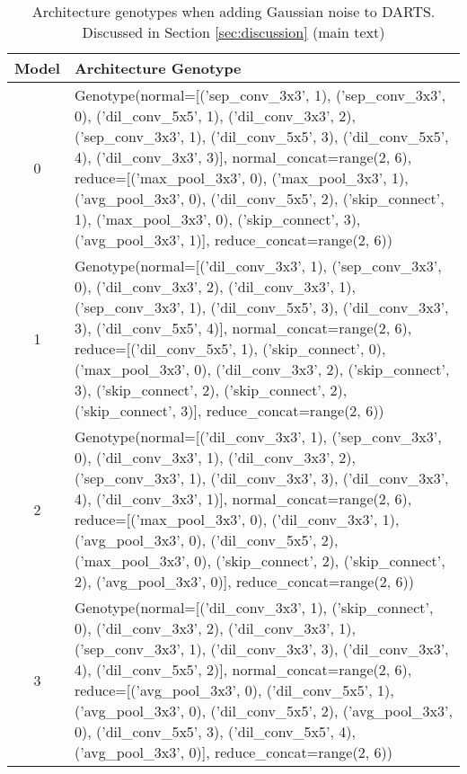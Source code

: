 \documentclass[runningheads]{llncs}
\begin{document}
\begin{table*}
	\begin{center}
		\caption{Architecture genotypes when adding Gaussian noise to DARTS. Discussed in Section \ref{sec:discussion} (main text)}
		\label{tab:noisy-darts-lr-decay}
		\begin{footnotesize}
			\begin{tabular}{cp{10cm}}  
				\hline
				Model & Architecture Genotype  \\
				\hline
				0 &  Genotype(normal=[('sep\_conv\_3x3', 1), ('sep\_conv\_3x3', 0), ('dil\_conv\_5x5', 1), ('dil\_conv\_3x3', 2), ('sep\_conv\_3x3', 1), ('dil\_conv\_5x5', 3), ('dil\_conv\_5x5', 4), ('dil\_conv\_3x3', 3)], normal\_concat=range(2, 6),
				reduce=[('max\_pool\_3x3', 0), ('max\_pool\_3x3', 1), ('avg\_pool\_3x3', 0), ('dil\_conv\_5x5', 2), ('skip\_connect', 1), ('max\_pool\_3x3', 0), ('skip\_connect', 3), ('avg\_pool\_3x3', 1)], reduce\_concat=range(2, 6))
				
				\\
				1 & Genotype(normal=[('dil\_conv\_3x3', 1), ('sep\_conv\_3x3', 0), ('dil\_conv\_3x3', 2), ('dil\_conv\_3x3', 1), ('sep\_conv\_3x3', 1), ('dil\_conv\_5x5', 3), ('dil\_conv\_3x3', 3), ('dil\_conv\_5x5', 4)], normal\_concat=range(2, 6),
				reduce=[('dil\_conv\_5x5', 1), ('skip\_connect', 0), ('max\_pool\_3x3', 0), ('dil\_conv\_3x3', 2), ('skip\_connect', 3), ('skip\_connect', 2), ('skip\_connect', 2), ('skip\_connect', 3)], reduce\_concat=range(2, 6))
				
				\\
				2 & Genotype(normal=[('dil\_conv\_3x3', 1), ('sep\_conv\_3x3', 0), ('dil\_conv\_3x3', 1), ('dil\_conv\_3x3', 2), ('sep\_conv\_3x3', 1), ('dil\_conv\_3x3', 3), ('dil\_conv\_3x3', 4), ('dil\_conv\_3x3', 1)], normal\_concat=range(2, 6),
				reduce=[('max\_pool\_3x3', 0), ('dil\_conv\_3x3', 1), ('avg\_pool\_3x3', 0), ('dil\_conv\_5x5', 2), ('max\_pool\_3x3', 0), ('skip\_connect', 2), ('skip\_connect', 2), ('avg\_pool\_3x3', 0)], reduce\_concat=range(2, 6))
				
				\\
				3 & Genotype(normal=[('dil\_conv\_3x3', 1), ('skip\_connect', 0), ('dil\_conv\_3x3', 2), ('dil\_conv\_3x3', 1), ('sep\_conv\_3x3', 1), ('dil\_conv\_3x3', 3), ('dil\_conv\_3x3', 4), ('dil\_conv\_5x5', 2)], normal\_concat=range(2, 6),
				reduce=[('avg\_pool\_3x3', 0), ('dil\_conv\_5x5', 1), ('avg\_pool\_3x3', 0), ('dil\_conv\_5x5', 2), ('avg\_pool\_3x3', 0), ('dil\_conv\_5x5', 3), ('dil\_conv\_5x5', 4), ('avg\_pool\_3x3', 0)], reduce\_concat=range(2, 6))
				\\ 
				\hline
			\end{tabular}
		\end{footnotesize}
	\end{center}
	
\end{table*}
\end{document}

